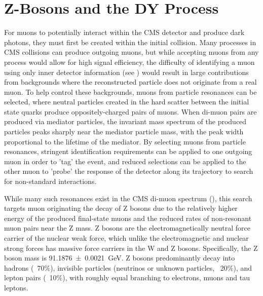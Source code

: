 \section{Z-Bosons and the DY Process}
For muons to potentially interact within the CMS detector and produce dark photons, they must first be created within the initial collision.
Many processes in CMS collisions can produce outgoing muons, but while accepting muons from any process would allow for high signal efficiency, the difficulty of identifying a muon using only inner detector information (see ) would result in large contributions from backgrounds where the reconstructed particle does not originate from a real muon.
To help control these backgrounds, muons from particle resonances can be selected, where neutral particles created in the hard scatter between the initial state quarks produce oppositely-charged pairs of muons.
When di-muon pairs are produced via mediator particles, the invariant mass spectrum of the produced particles peaks sharply near the mediator particle mass, with the peak width proportional to the lifetime of the mediator. 
By selecting muons from particle resonances, stringent identification requirements can be applied to one outgoing muon in order to 'tag' the event, and reduced selections can be applied to the other muon to 'probe' the response of the detector along its trajectory to search for non-standard interactions. 

While many such resonances exist in the CMS di-muon spectrum (), this search targets muon originating the decay of Z bosons due to the relatively higher energy of the produced final-state muons and the reduced rates of non-resonant muon pairs near the Z mass.
Z bosons are the electromagnetically neutral force carrier of the nuclear weak force, which unlike the electromagnetic and nuclear strong forces has massive force carriers in the W and Z bosons.
Specifically, the Z boson mass is \SI{91.1876\pm0.0021}{\giga\eV}. 
Z bosons predominantly decay into hadrons (~70$\%$), invisible particles (neutrinos or unknown particles, ~20$\%$), and lepton pairs (~10$\%$), with roughly equal branching to electrons, muons and tau leptons.


